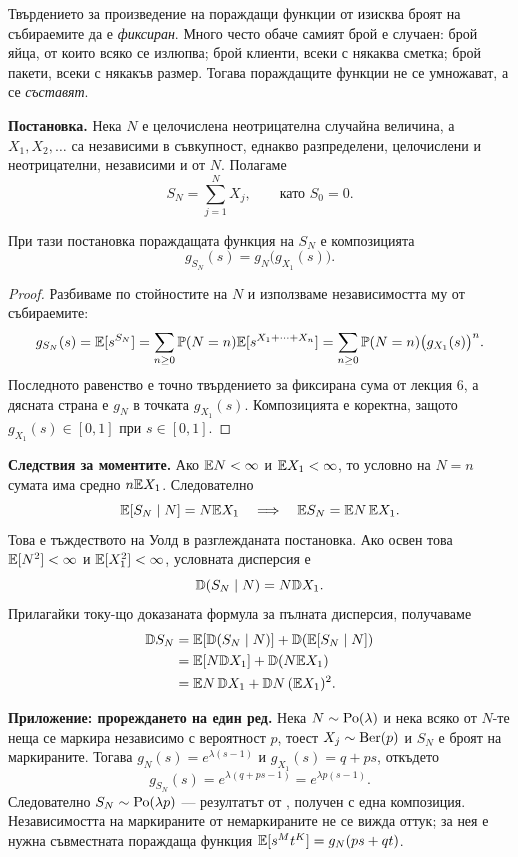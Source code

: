 \begin{supp}
Твърдението\label{supp:random-sum} за произведение на пораждащи функции от
 изисква броят на събираемите да е
\emph{фиксиран}. Много често обаче самият брой е случаен: брой яйца, от които
всяко се излюпва; брой клиенти, всеки с някаква сметка; брой пакети, всеки с
някакъв размер. Тогава пораждащите функции не се умножават, а се
\emph{съставят}.

\textbf{Постановка.} Нека $N$ е целочислена неотрицателна случайна величина, а
$X_1,X_2,\dots$ са независими в съвкупност, еднакво разпределени, целочислени
и неотрицателни, независими и от $N$. Полагаме
\[
S_N=\sum_{j=1}^{N}X_j,\qquad\text{като }S_0=0.
\]

\begin{prop}
При тази постановка пораждащата функция на $S_N$ е композицията
\[
g_{S_N}(s)=g_N\bigl(g_{X_1}(s)\bigr).
\]
\end{prop}

\begin{proof}
Разбиваме по стойностите на $N$ и използваме независимостта му от събираемите:
\[
g_{S_N}(s)=\mathbb{E}[s^{S_N}]
=\sum_{n\ge0}\mathbb P(N=n)\mathbb{E}[s^{X_1+\dots+X_n}]
=\sum_{n\ge0}\mathbb P(N=n)\bigl(g_{X_1}(s)\bigr)^n.
\]
Последното равенство е точно твърдението за фиксирана сума от лекция 6, а
дясната страна е $g_N$ в точката $g_{X_1}(s)$. Композицията е коректна, защото
$g_{X_1}(s)\in[0,1]$ при $s\in[0,1]$.
\end{proof}

\textbf{Следствия за моментите.} Ако $\mathbb{E} N<\infty$ и $\mathbb{E} X_1<\infty$, то
условно на $N=n$ сумата има средно $n\mathbb{E} X_1$. Следователно
\[
\mathbb{E}[S_N\mid N]=N\mathbb{E} X_1
\quad\Longrightarrow\quad
\mathbb{E} S_N=\mathbb{E} N\,\mathbb{E} X_1.
\]
Това е тъждеството на Уолд в разглежданата постановка. Ако освен това
$\mathbb{E}[N^2]<\infty$ и $\mathbb{E}[X_1^2]<\infty$, условната дисперсия е
\[
\mathbb{D}(S_N\mid N)=N\mathbb{D} X_1.
\]
Прилагайки току-що доказаната формула за пълната дисперсия, получаваме
\begin{align*}
\mathbb{D} S_N
&=\mathbb{E}[\mathbb{D}(S_N\mid N)]+\mathbb{D}(\mathbb{E}[S_N\mid N])\\
&=\mathbb{E}[N\mathbb{D} X_1]+\mathbb{D}(N\mathbb{E} X_1)\\
&=\mathbb{E} N\,\mathbb{D} X_1+\mathbb{D} N\,(\mathbb{E} X_1)^2.
\end{align*}

\textbf{Приложение: прореждането на един ред.} Нека $N\sim\operatorname{Po}(\lambda)$ и
нека всяко от $N$-те неща се маркира независимо с вероятност $p$, тоест
$X_j\sim\operatorname{Ber}(p)$ и $S_N$ е броят на маркираните. Тогава
$g_N(s)=e^{\lambda(s-1)}$ и $g_{X_1}(s)=q+ps$, откъдето
\[
g_{S_N}(s)=e^{\lambda(q+ps-1)}=e^{\lambda p(s-1)}.
\]
Следователно $S_N\sim\operatorname{Po}(\lambda p)$ — резултатът от
, получен с една
композиция. Независимостта на маркираните от немаркираните не се вижда оттук;
за нея е нужна съвместната пораждаща функция
$\mathbb{E}[s^Mt^K]=g_N(ps+qt)$.
\end{supp}

